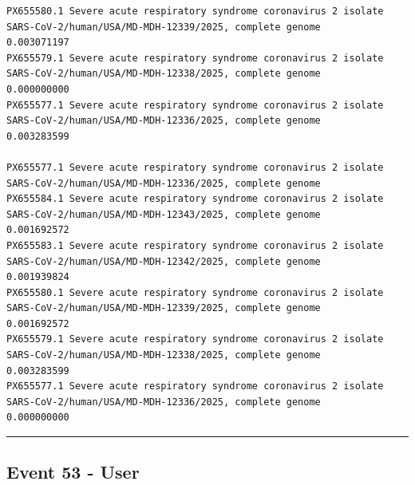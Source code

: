 \documentclass[
  11pt,
]{article}
\newenvironment{rpoutput}{\vspace{0.5em}\begin{snugshade}}{\end{snugshade}}
\begin{document}
\begin{rpoutput}
\begin{verbatim}
PX655580.1 Severe acute respiratory syndrome coronavirus 2 isolate SARS-CoV-2/human/USA/MD-MDH-12339/2025, complete genome                                                                                                                0.003071197
PX655579.1 Severe acute respiratory syndrome coronavirus 2 isolate SARS-CoV-2/human/USA/MD-MDH-12338/2025, complete genome                                                                                                                0.000000000
PX655577.1 Severe acute respiratory syndrome coronavirus 2 isolate SARS-CoV-2/human/USA/MD-MDH-12336/2025, complete genome                                                                                                                0.003283599
                                                                                                                           PX655577.1 Severe acute respiratory syndrome coronavirus 2 isolate SARS-CoV-2/human/USA/MD-MDH-12336/2025, complete genome
PX655584.1 Severe acute respiratory syndrome coronavirus 2 isolate SARS-CoV-2/human/USA/MD-MDH-12343/2025, complete genome                                                                                                                0.001692572
PX655583.1 Severe acute respiratory syndrome coronavirus 2 isolate SARS-CoV-2/human/USA/MD-MDH-12342/2025, complete genome                                                                                                                0.001939824
PX655580.1 Severe acute respiratory syndrome coronavirus 2 isolate SARS-CoV-2/human/USA/MD-MDH-12339/2025, complete genome                                                                                                                0.001692572
PX655579.1 Severe acute respiratory syndrome coronavirus 2 isolate SARS-CoV-2/human/USA/MD-MDH-12338/2025, complete genome                                                                                                                0.003283599
PX655577.1 Severe acute respiratory syndrome coronavirus 2 isolate SARS-CoV-2/human/USA/MD-MDH-12336/2025, complete genome                                                                                                                0.000000000
\end{verbatim}

\end{rpoutput}

\begin{center}\rule{0.5\linewidth}{0.5pt}\end{center}

\subsection{Event 53 - User}\label{event-53---user}
\end{document}
